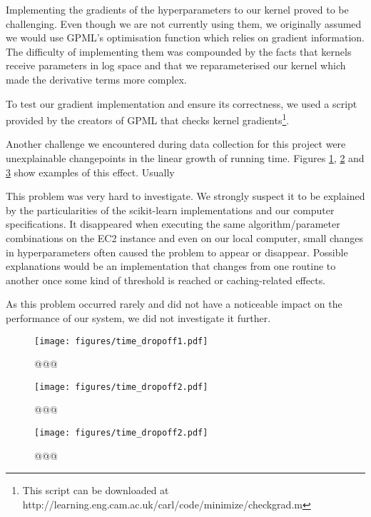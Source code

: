 \documentclass[a4paper,12pt,twoside,openright]{report}
\begin{document}
Implementing the gradients of the hyperparameters to our kernel proved to be challenging. Even though we are not currently using them, we originally assumed we would use GPML's optimisation function which relies on gradient information. The difficulty of implementing them was compounded by the facts that kernels receive parameters in log space and that we reparameterised our kernel which made the derivative terms more complex.

To test our gradient implementation and ensure its correctness, we used a script provided by the creators of GPML that checks kernel gradients\footnote{This script can be downloaded at http://learning.eng.cam.ac.uk/carl/code/minimize/checkgrad.m}. %

Another challenge we encountered during data collection for this project were unexplainable changepoints in the linear growth of running time. Figures \ref{time_dropoff1}, \ref{time_dropoff2} and \ref{time_dropoff3} show examples of this effect. Usually

This problem was very hard to investigate. We strongly suspect it to be explained by the particularities of the scikit-learn implementations and our computer specifications. It  disappeared when executing the same algorithm/parameter combinations on the EC2 instance and even on our local computer, small changes in hyperparameters often caused the problem to appear or disappear. Possible explanations would be an implementation that changes from one routine to another once some kind of threshold is reached or caching-related effects.

As this problem occurred rarely and did not have a noticeable impact on the performance of our system, we did not investigate it further.


\begin{figure}
\centering
  \texttt{[image: figures/time\_dropoff1.pdf]}
  \caption{@@@}
  \label{time_dropoff1}
\end{figure}
\begin{figure}
\centering
  \texttt{[image: figures/time\_dropoff2.pdf]}
  \caption{@@@}
  \label{time_dropoff2}
\end{figure}
\begin{figure}
\centering
  \texttt{[image: figures/time\_dropoff2.pdf]}
  \caption{@@@}
  \label{time_dropoff3}
\end{figure}
\end{document}
